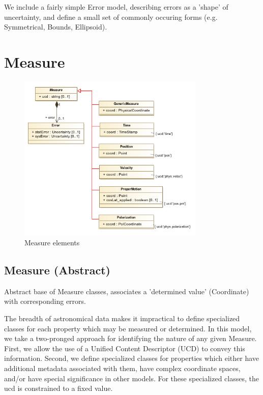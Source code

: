 We include a fairly simple Error model, describing errors as a 'shape' of uncertainty, and define a small set of commonly occuring forms (e.g. Symmetrical, Bounds, Ellipsoid).

\pagebreak
\section{Measure}

  \begin{figure}[h]
  \begin{center}
    \includegraphics[width=3.5in]{diagrams/Measure.png}
    \caption{Measure elements}\label{fig:measure}
  \end{center}
  \end{figure}

  \subsection{Measure (Abstract)}
  \label{sect:Measure}
    Abstract base of Measure classes, associates a 'determined value' (Coordinate) with corresponding errors.

    The breadth of astronomical data makes it impractical to define specialized classes for each property which may be measured or determined. In this model, we take a two-pronged approach for identifying the nature of any given Measure. First, we allow the use of a Unified Content Descriptor (UCD) to convey this information. Second, we define specialized classes for properties which either have additional metadata associated with them, have complex coordinate spaces, and/or have special significance in other models. For these specialized classes, the ucd is constrained to a fixed value.

